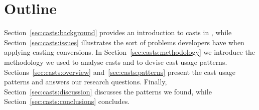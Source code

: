 \section*{Outline}

Section~\ref{sec:casts:background} provides an introduction to casts in \java{},
while Section~\ref{sec:casts:issues} illustrates the sort of problems developers have when applying casting conversions.
In Section~\ref{sec:casts:methodology} we introduce the methodology we used to analyse casts and to devise cast usage patterns.
Sections~\ref{sec:casts:overview} and~\ref{sec:casts:patterns} present the cast usage patterns and answers our research questions.
Finally, Section~\ref{sec:casts:discussion} discusses the patterns we found,
while Section~\ref{sec:casts:conclusions} concludes.










